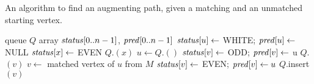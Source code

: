 \begin{algorithm}[H]
  \caption{An algorithm to find an augmenting path, given a matching
and an unmatched starting vertex.}
    \label{alg:augpath}
\begin{algorithmic}[1]
	\State queue $Q$
	\State array $\operatorname{\text{\textit{status}}}[0..n-1]$, $\operatorname{\text{\textit{pred}}}[0..n-1]$
  		\State $\operatorname{\text{\textit{status}}}[u] \gets $ WHITE; $\operatorname{\text{\textit{pred}}}[u] \gets $ NULL 
	\EndFor
	\State $\operatorname{\text{\textit{status}}}[x] \gets $ EVEN
	\State $Q$.$(x)$
		\State $u \gets Q$.$()$
 					\State $\operatorname{\text{\textit{status}}}[v] \gets$ ODD; $\operatorname{\text{\textit{pred}}}[v] \gets$ u
 						\State {}
 					\Else
	 					\State $Q$.$(v)$
 					\EndIf
 				\EndIf
 			\EndFor
 		\Else 			{} 
			\State $v \gets$ matched vertex of $u$ from $M$
				\State$\operatorname{\text{\textit{status}}}[v] \gets$ EVEN; $\operatorname{\text{\textit{pred}}}[v] \gets u$
 				\State$Q$.insert$(v)$
	 		\EndIf
 		\EndIf
	\EndWhile
	\State {} 
\EndFunction
\end{algorithmic}
\end{algorithm}



